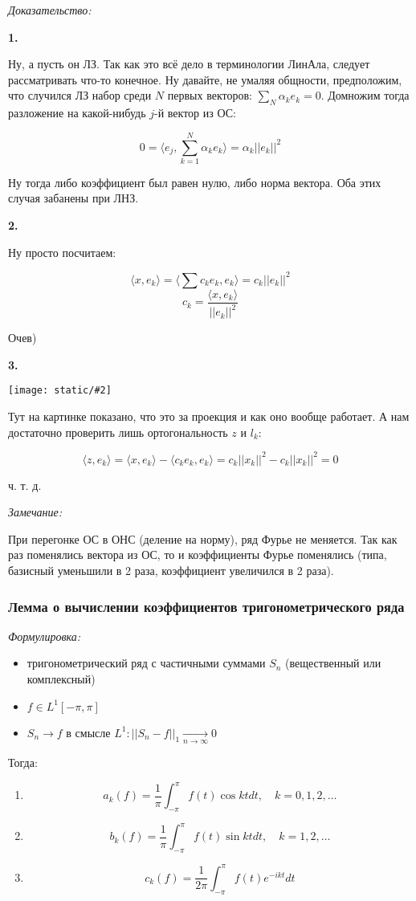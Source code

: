 \documentclass{article}
\def\images#1#2{\begin{center}\texttt{[image: static/\#2]}\end{center}}
\def\goesto#1{\underset{#1}{\longrightarrow}}
\def\toinf#1{\goesto{#1 \rightarrow \infty}}
\def\ntoinf{\toinf{n}}
\def\sk#1#2{\langle #1, #2 \rangle}
\begin{document}
\textit{Доказательство:}

\textbf{1.}

Ну, а пусть он ЛЗ. Так как это всё дело в терминологии ЛинАла, следует рассматривать что-то конечное. Ну давайте, не умаляя общности, предположим, что случился ЛЗ набор среди $N$ первых векторов: $\sum_N \alpha_k e_k = 0$. Домножим тогда разложение на какой-нибудь $j$-й вектор из ОС:

\[0 = \sk{e_j}{\sum_{k = 1}^{N} \alpha_k e_k} = \alpha_k ||e_k||^2\]

Ну тогда либо коэффициент был равен нулю, либо норма вектора. Оба этих случая забанены при ЛНЗ.

\textbf{2.}

Ну просто посчитаем:

\[\sk{x}{e_k} = \sk{\sum c_k e_k}{e_k} = c_k ||e_k||^2\]
\[c_k = \frac{\sk{x}{e_k}}{||e_k||^2}\]

Очев)

\textbf{3.}

\images{0.3}{ort_sys.jpg}

Тут на картинке показано, что это за проекция и как оно вообще работает. А нам достаточно проверить лишь ортогональность $z$ и $l_k$:

\[\sk{z}{e_k} = \sk{x}{e_k} - \sk{c_ke_k}{e_k} = c_k ||x_k||^2 - c_k ||x_k||^2 = 0\]

ч. т. д. 

\textit{Замечание:}

При перегонке ОС в ОНС (деление на норму), ряд Фурье не меняется. Так как раз поменялись вектора из ОС, то и коэффициенты Фурье поменялись (типа, базисный уменьшили в 2 раза, коэффициент увеличился в 2 раза).

\subsubsection{Лемма о вычислении коэффициентов тригонометрического ряда}
\textit{Формулировка:}

\begin{itemize}
    \item тригонометрический ряд с частичными суммами $S_n$ (вещественный или комплексный)
    \item $f \in L^1[-\pi, \pi]$
    \item $S_n \rightarrow f$ в смысле $L^1: ||S_n - f||_1 \ntoinf 0$
\end{itemize}

Тогда:

\begin{enumerate}
    \item \[a_k(f) = \frac{1}{\pi} \int_{-\pi}^{\pi} f(t) \cos kt dt, \quad k = 0, 1, 2, \ldots\]
    \item \[b_k(f) = \frac{1}{\pi} \int_{-\pi}^{\pi} f(t) \sin kt dt, \quad k = 1, 2, \ldots\]
    \item \[c_k(f) = \frac{1}{2\pi} \int_{-\pi}^{\pi} f(t) e^{-ikt} dt\]
\end{enumerate}
\end{document}

